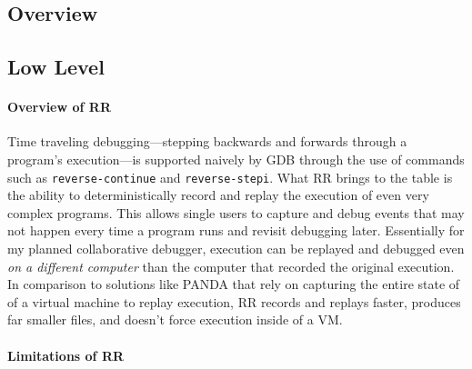 \documentclass[12pt]{article}
\begin{document}
\subsection{Overview}


\subsection{Low Level}

\paragraph{Overview of RR}

Time traveling debugging---stepping backwards and forwards through a
program's execution---is supported naively by GDB through the use of
commands such as \lstinline{reverse-continue} and
\lstinline{reverse-stepi}.\cite{gdbman} What RR brings to the table is
the ability to deterministically record and replay the execution of
even very complex programs.  This allows single users to capture and
debug events that may not happen every time a program runs and revisit
debugging later.  Essentially for my planned collaborative debugger,
execution can be replayed and debugged even \textit{on a different
  computer} than the computer that recorded the original execution.
In comparison to solutions like PANDA\cite{10.1145/2843859.2843867}
that rely on capturing the entire state of of a virtual machine to
replay execution, RR records and replays faster, produces far smaller
files, and doesn't force execution inside of a
VM.\cite{DBLP:journals/corr/OCallahanJFHNP17}

\paragraph{Limitations of RR}
\end{document}
